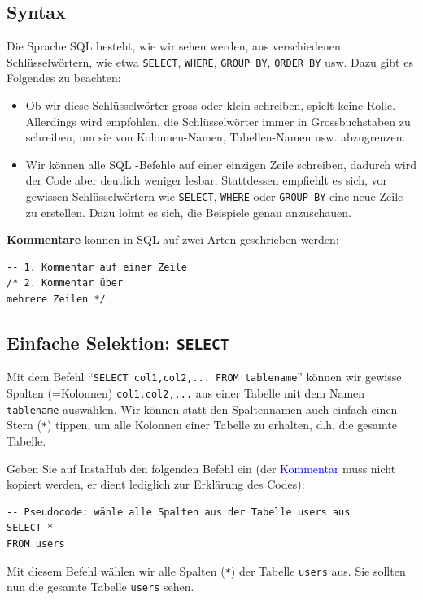 \subsection{Syntax}
Die Sprache \gls{SQL} besteht, wie wir sehen werden, aus verschiedenen Schlüsselwörtern, wie etwa \lstinline[style=sql]|SELECT|, \lstinline[style=sql]|WHERE|, \lstinline[style=sql]|GROUP BY|, \lstinline[style=sql]|ORDER BY| usw. Dazu gibt es Folgendes zu beachten:
\begin{itemize}
	\item Ob wir diese Schlüsselwörter gross oder klein schreiben, spielt keine Rolle. Allerdings wird empfohlen, die Schlüsselwörter immer in Grossbuchstaben zu schreiben, um sie von Kolonnen-Namen, Tabellen-Namen usw. abzugrenzen.
	\item Wir können alle \gls{SQL} -Befehle auf einer einzigen Zeile schreiben, dadurch wird der Code aber deutlich weniger lesbar. Stattdessen empfiehlt es sich, vor gewissen Schlüsselwörtern wie \lstinline[style=sql]|SELECT|, \lstinline[style=sql]|WHERE| oder \lstinline[style=sql]|GROUP BY| eine neue Zeile zu erstellen. Dazu lohnt es sich, die Beispiele genau anzuschauen.
\end{itemize}

\textbf{Kommentare} können in \gls{SQL}  auf zwei Arten geschrieben werden:

\begin{lstlisting}[style=sql]
-- 1. Kommentar auf einer Zeile
/* 2. Kommentar über
mehrere Zeilen */
\end{lstlisting}

\subsection{Einfache Selektion: \lstinline[style=sql]|SELECT|}

Mit dem Befehl ``\lstinline[style=sql]|SELECT col1,col2,... FROM tablename|'' können wir gewisse Spalten (=Kolonnen) \lstinline[style=sql]|col1,col2,...| aus einer Tabelle mit dem Namen \lstinline[style=sql]|tablename| auswählen. Wir können statt den Spaltennamen auch einfach einen Stern (\texttt{*}) tippen, um alle Kolonnen einer Tabelle zu erhalten, d.h. die gesamte Tabelle.


\begin{myexample}
Geben Sie auf InstaHub den folgenden Befehl ein (der \textcolor{blue}{Kommentar} muss nicht kopiert werden, er dient lediglich zur Erklärung des Codes):

\begin{lstlisting}[style=sql]
-- Pseudocode: wähle alle Spalten aus der Tabelle users aus
SELECT *
FROM users
\end{lstlisting}

	
Mit diesem Befehl wählen wir alle Spalten (\lstinline[style=sql]|*|) der Tabelle \lstinline[style=sql]|users| aus. 
Sie sollten nun die gesamte Tabelle \texttt{users} sehen.
\end{myexample}


